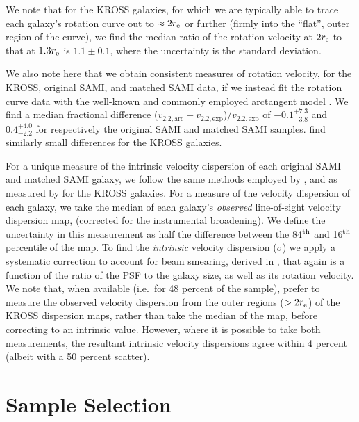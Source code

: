 \documentclass[a4paper,fleqn,usenatbib]{mnras}
\begin{document}
{We note that for the KROSS galaxies, for which we are typically able to trace each galaxy's rotation curve out to $\approx2r_{\rm{e}}$ or further (firmly into the ``flat'', outer region of the curve), we find the median ratio of the rotation velocity at $2r_{\rm{e}}$ to that at $1.3r_{\rm{e}}$ is $1.1\pm0.1$, where the uncertainty is the standard deviation. 

We also note here that we obtain consistent measures of rotation velocity, for the KROSS, original SAMI, and matched SAMI data, if we instead fit the rotation curve data with the well-known and commonly employed arctangent model \citep{Courteau:1997aa}. We find a median fractional difference ($v_{2.2,\text{arc}}-v_{2.2,\text{exp}}$)/$v_{2.2,\text{exp}}$ of $-0.1^{+7.3}_{-3.8}$ and $0.4^{+4.0}_{-2.2}$ for respectively the original SAMI and matched SAMI samples. \citet{Harrison:2017} find similarly small differences for the KROSS galaxies.

For a unique measure of the intrinsic velocity dispersion of each original SAMI and matched SAMI galaxy, we follow the same methods employed by \citet{Johnson:2018}, and as measured by \citet{Harrison:2017} for the KROSS galaxies. For a measure of the velocity dispersion of each galaxy, we take the median of each galaxy's {\em observed} line-of-sight velocity dispersion map, (corrected for the instrumental broadening). We define the uncertainty in this measurement as half the difference between the 84$^{\rm{th}}$ and 16$^{\rm{th}}$ percentile of the map. To find the {\em intrinsic} velocity dispersion ($\sigma$) we apply a systematic correction to account for beam smearing, derived in \citet{Johnson:2018}, that again is a function of the ratio of the PSF to the galaxy size, as well as its rotation velocity. We note that, when available (i.e.\ for 48 percent of the sample), \citet{Harrison:2017} prefer to measure the observed velocity dispersion from the outer regions ($>2r_{\rm{e}}$) of the KROSS dispersion maps, rather than take the median of the map, before correcting to an intrinsic value. However, where it is possible to take both measurements, the resultant intrinsic velocity dispersions agree within 4 percent (albeit with a 50 percent scatter). 

\section{Sample Selection}
\label{sec:SAMIvsKROSSsample}

}
\end{document}
